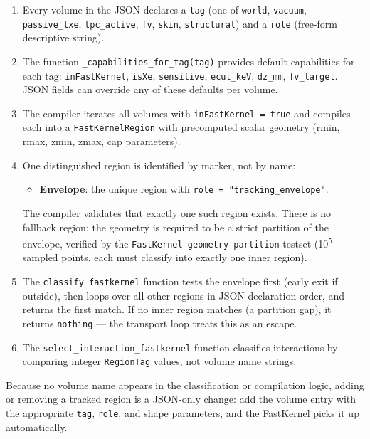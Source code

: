 \documentclass[11pt]{article}
\begin{document}
\begin{enumerate}[label=\arabic*.]
\item Every volume in the JSON declares a \texttt{tag} (one of \texttt{world},
\texttt{vacuum}, \texttt{passive\_lxe}, \texttt{tpc\_active}, \texttt{fv},
\texttt{skin}, \texttt{structural}) and a \texttt{role} (free-form descriptive
string).

\item The function \texttt{\_capabilities\_for\_tag(tag)} provides default
capabilities for each tag: \texttt{inFastKernel}, \texttt{isXe},
\texttt{sensitive}, \texttt{ecut\_keV}, \texttt{dz\_mm}, \texttt{fv\_target}.
JSON fields can override any of these defaults per volume.

\item The compiler iterates all volumes with \texttt{inFastKernel = true} and
compiles each into a \texttt{FastKernelRegion} with precomputed scalar geometry
(rmin, rmax, zmin, zmax, cap parameters).

\item One distinguished region is identified by marker, not by name:
\begin{itemize}
\item \textbf{Envelope}: the unique region with \texttt{role = "tracking\_envelope"}.
\end{itemize}
The compiler validates that exactly one such region exists. There is no
fallback region: the geometry is required to be a strict partition of
the envelope, verified by the \texttt{FastKernel geometry partition}
testset (10\textsuperscript{5} sampled points, each must classify into
exactly one inner region).

\item The \texttt{classify\_fastkernel} function tests the envelope first
(early exit if outside), then loops over all other regions in JSON declaration
order, and returns the first match. If no inner region matches (a partition
gap), it returns \texttt{nothing} --- the transport loop treats this as an
escape.

\item The \texttt{select\_interaction\_fastkernel} function classifies
interactions by comparing integer \texttt{RegionTag} values, not volume name
strings.
\end{enumerate}

Because no volume name appears in the classification or compilation logic,
adding or removing a tracked region is a JSON-only change: add the volume entry
with the appropriate \texttt{tag}, \texttt{role}, and shape parameters, and the
FastKernel picks it up automatically.
\end{document}
